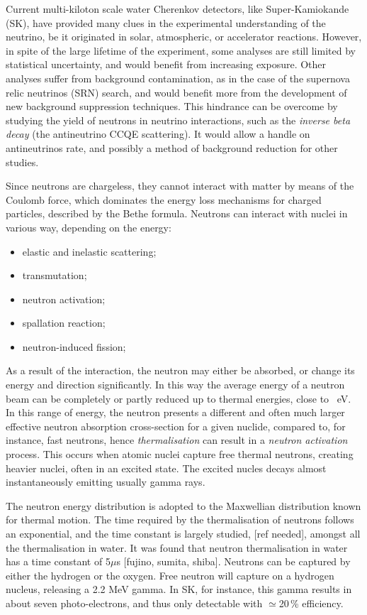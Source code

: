 Current multi-kiloton scale water Cherenkov detectors, like Super-Kamiokande (SK), have provided %
many clues in the experimental understanding of the neutrino, be it originated in solar, atmospheric, or %
accelerator reactions.
However, in spite of the large lifetime of the experiment, some analyses are still limited by statistical uncertainty, %
and would benefit from increasing exposure.
Other analyses suffer from background contamination, as in the case of the supernova relic neutrinos (SRN) search, %
and would benefit more from the development of new background suppression techniques.
This hindrance can be overcome by studying the yield of neutrons in neutrino interactions, such as the %
\emph{inverse beta decay} (the antineutrino CCQE scattering).
It would allow a handle on antineutrinos rate, and possibly a method of background reduction for other studies.

Since neutrons are chargeless, they cannot interact with matter by means of the Coulomb force, %
which dominates the energy loss mechanisms for charged particles, described by the Bethe formula.
Neutrons can interact with nuclei in various way, depending on the energy:
\begin{itemize}
	\item elastic and inelastic scattering;
	\item transmutation;
	\item neutron activation;
	\item spallation reaction;
	\item neutron-induced fission;
\end{itemize}

As a result of the interaction, the neutron may either be absorbed, or change its energy and direction significantly.
In this way the average energy of a neutron beam can be completely or partly reduced up to thermal energies, %
close to ~eV.
In this range of energy, the neutron presents a different and often much larger effective neutron absorption %
cross-section for a given nuclide, compared to, for instance, fast neutrons, hence \emph{thermalisation} can %
result in a \emph{neutron activation} process.
This occurs when atomic nuclei capture free thermal neutrons, creating heavier nuclei, often in an excited state.
The excited nucles decays almost instantaneously emitting usually gamma rays.

The neutron energy distribution is adopted to the Maxwellian distribution known for thermal motion.
The time required by the thermalisation of neutrons follows an exponential, and the time constant is largely %
studied, [ref needed], amongst all the thermalisation in water.
It was found that neutron thermalisation in water has a time constant of 5$\mu$s [fujino, sumita, shiba].
Neutrons can be captured by either the hydrogen or the oxygen.
Free neutron will capture on a hydrogen nucleus, releasing a 2.2 MeV gamma.
In SK, for instance, this gamma results in about seven photo-electrons, and thus only detectable with $\simeq$20\,\% %
efficiency.

